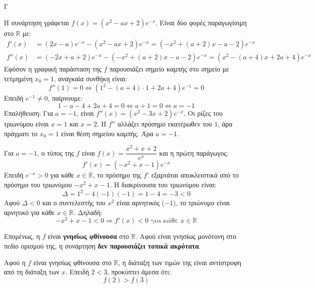 \begin{thema}{Γ}
\begin{erwthma}
\item Η συνάρτηση γράφεται $f(x)=\left(x^2-ax+2\right)e^{-x}$. Είναι δύο φορές παραγωγίσιμη στο $\mathbb{R}$ με:
\begin{align*}
f'(x) &= (2x-a)e^{-x} - \left(x^2-ax+2\right)e^{-x} = \left(-x^2+(a+2)x-a-2\right)e^{-x} \\
f''(x) &= (-2x+a+2)e^{-x} - \left(-x^2+(a+2)x-a-2\right)e^{-x} = \left(x^2-(a+4)x+2a+4\right)e^{-x}
\end{align*}
Εφόσον η γραφική παράσταση της $f$ παρουσιάζει σημείο καμπής στο σημείο με τετμημένη $x_0=1$, αναγκαία συνθήκη είναι:
\[f''(1)=0 \Leftrightarrow \left(1^2-(a+4)\cdot 1+2a+4\right)e^{-1}=0\]
Επειδή $e^{-1}\neq 0$, παίρνουμε:
\[1-a-4+2a+4=0 \Leftrightarrow a+1=0 \Leftrightarrow a=-1\]
Επαλήθευση: Για $a=-1$, είναι $f''(x)=\left(x^2-3x+2\right)e^{-x}$. Οι ρίζες του τριωνύμου είναι $x=1$ και $x=2$. Η $f''$ αλλάζει πρόσημο εκατέρωθεν του $1$, άρα πράγματι το $x_0=1$ είναι θέση σημείου καμπής. Άρα $a=-1$.

\item Για $a=-1$, ο τύπος της $f$ είναι $f(x)=\dfrac{x^2+x+2}{e^x}$ και η πρώτη παράγωγος:
\[f'(x)=\left(-x^2+x-1\right)e^{-x}\]
Επειδή $e^{-x}>0$ για κάθε $x\in\mathbb{R}$, το πρόσημο της $f'$ εξαρτάται αποκλειστικά από το πρόσημο του τριωνύμου $-x^2+x-1$.
Η διακρίνουσα του τριωνύμου είναι:
\[\Delta=1^2-4(-1)(-1)=1-4=-3<0\]
Αφού $\Delta<0$ και ο συντελεστής του $x^2$ είναι αρνητικός ($-1$), το τριώνυμο είναι αρνητικό για κάθε $x\in\mathbb{R}$. Δηλαδή:
\[-x^2+x-1<0 \Rightarrow f'(x)<0 \text{ για κάθε } x\in\mathbb{R}\]
\begin{center}
\end{center}
Επομένως, η $f$ είναι \textbf{γνησίως φθίνουσα} στο $\mathbb{R}$. Αφού είναι γνησίως μονότονη στο πεδίο ορισμού της, η συνάρτηση \textbf{δεν παρουσιάζει τοπικά ακρότατα}.

\item Αφού η $f$ είναι γνησίως φθίνουσα στο $\mathbb{R}$, η διάταξη των τιμών της είναι αντίστροφη από τη διάταξη των $x$. Επειδή $2 < 3$, προκύπτει άμεσα ότι:
\[f(2) > f(3)\]


\end{erwthma}
\end{thema}
